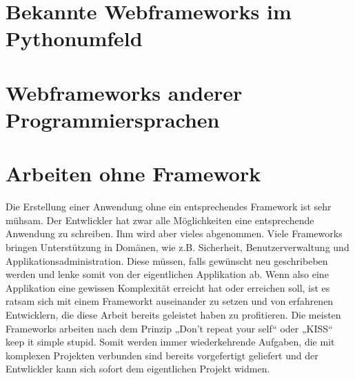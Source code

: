 \section{Bekannte Webframeworks im Pythonumfeld}
\section{Webframeworks anderer Programmiersprachen }
\section{Arbeiten ohne Framework}
Die Erstellung einer Anwendung ohne ein entsprechendes Framework ist sehr
mühsam. Der Entwlickler hat zwar alle Möglichkeiten eine entsprechende
Anwendung zu schreiben. Ihm wird aber vieles abgenommen. Viele Frameworks
bringen Unterstützung in Domänen, wie z.B. Sicherheit, Benutzerverwaltung und
Applikationsadministration. Diese müssen, falls gewünscht neu geschribeben
werden und lenke somit von der eigentlichen Applikation ab. Wenn also eine
Applikation eine gewissen Komplexität erreicht hat oder erreichen soll, ist es
ratsam sich mit einem Frameworkt auseinander zu setzen und von erfahrenen
Entwicklern, die diese Arbeit bereits geleistet haben zu profitieren. Die
meisten Frameworks arbeiten nach dem Prinzip „Don't repeat your self“ oder
„KISS“ keep it simple stupid. Somit werden immer wiederkehrende Aufgaben, die
mit komplexen Projekten verbunden sind bereits vorgefertigt geliefert und der
Entwlickler kann sich sofort dem eigentlichen Projekt widmen. 


